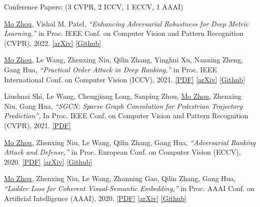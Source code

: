 \documentclass[10pt,margin,line,pifont,palatino,courier]{res}
\begin{document}
\begin{resume}
\begin{enumerate}[noitemsep, leftmargin=*, label={[J0{\arabic*}]}]
\end{enumerate}

	{\sc Conference Papers:}\hfill
	(3 CVPR, 2 ICCV, 1 ECCV, 1 AAAI)\\

\begin{enumerate}[noitemsep, leftmargin=*, label={[C0{\arabic*}]}]

\item \underline{Mo Zhou}, Vishal M. Patel,
\textit{``Enhancing Adversarial Robustness for Deep Metric Learning,''}
in Proc. IEEE Conf. on Computer Vision and Pattern Recognition (CVPR), 2022.
\href{https://arxiv.org/abs/2203.01439}{[arXiv]}
\href{https://github.com/cdluminate/robdml}{[Github]}

\item \underline{Mo Zhou}, Le Wang, Zhenxing Niu, Qilin Zhang, Yinghui Xu, Nanning Zheng, Gang Hua,
\textit{``Practical Order Attack in Deep Ranking,''}
in Proc. IEEE International Conf. on Computer Vision (ICCV), 2021.
\href{https://openaccess.thecvf.com/content/ICCV2021/html/Zhou_Practical_Relative_Order_Attack_in_Deep_Ranking_ICCV_2021_paper.html}{[PDF]}
\href{https://arxiv.org/abs/2103.05248}{[arXiv]}
\href{https://github.com/cdluminate/advorder}{[Github]}

\item Liushuai Shi, Le Wang, Chengjiang Long, Sanping Zhou, \underline{Mo Zhou}, Zhenxing Niu, Gang Hua,
\textit{``SGCN: Sparse Graph Convolution for Pedestrian Trajectory Prediction'',}
In Proc. IEEE Conf. on Computer Vision and Pattern Recognition (CVPR), 2021.
\href{https://openaccess.thecvf.com/content/CVPR2021/html/Shi_SGCN_Sparse_Graph_Convolution_Network_for_Pedestrian_Trajectory_Prediction_CVPR_2021_paper.html}{[PDF]}

\item \underline{Mo Zhou}, Zhenxing Niu, Le Wang, Qilin Zhang, Gang Hua,
\textit{``Adversarial Ranking Attack and Defense,''}
in Proc. European Conf. on Computer Vision (ECCV), 2020.
\href{https://link.springer.com/chapter/10.1007/978-3-030-58568-6_46}{[PDF]}
\href{https://arxiv.org/abs/2002.11293}{[arXiv]}
\href{https://cdluminate.github.io/advrank/}{[Github]}

\item  \underline{Mo Zhou}, Zhenxing Niu, Le Wang, Zhanning Gao, Qilin Zhang, Gang Hua,
\textit{``Ladder Loss for Coherent Visual-Semantic Embedding,''}
in Proc. AAAI Conf. on Artificial Intelligence (AAAI), 2020.
\href{https://ojs.aaai.org//index.php/AAAI/article/view/7006}{[PDF]}
\href{https://arxiv.org/abs/1911.07528}{[arXiv]}
\href{https://github.com/cdluminate/ladderloss}{[Github]}


\end{enumerate}
\end{resume}
\end{document}
